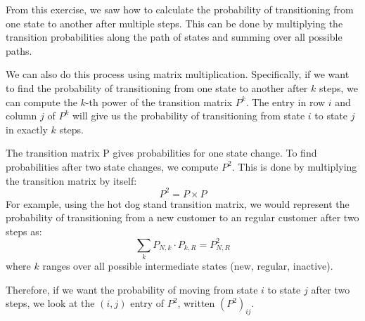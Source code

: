 From this exercise, we saw how to calculate the probability of transitioning from one state to another after multiple steps. This can be done by multiplying the transition probabilities along the path of states and summing over all possible paths.

We can also do this process using matrix multiplication. Specifically, if we want to find the probability of transitioning from one state to another after $k$ steps, we can compute the $k$-th power of the transition matrix $P^k$. The entry in row $i$ and column $j$ of $P^k$ will give us the probability of transitioning from state $i$ to state $j$ in exactly $k$ steps.

The transition matrix P gives probabilities for one state change. To find probabilities after two state changes, we compute $P^2$. This is done by multiplying the transition matrix by itself:
\[
    P^2 = P \times P
\]
For example, using the hot dog stand transition matrix, we would represent the probability of transitioning from a new customer to an regular customer after two steps as:
\[
    \sum_{k} P_{N,k} \cdot P_{k,R}= P^2_{N,R}
\]
where $k$ ranges over all possible intermediate states (new, regular, inactive).

Therefore, if we want the probability of moving from state $i$ to state $j$ after two steps, we look at the $(i,j)$ entry of $P^2$, written $(P^2)_{ij}$.

